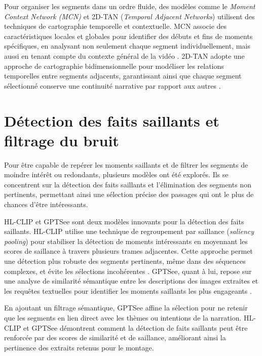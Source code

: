 \documentclass[livre]{udes-genie-these}
\begin{document}
Pour organiser les segments dans un ordre fluide, des modèles comme le \textit{Moment Context Network (MCN)} \cite{anonymous2017_localizing} et 2D-TAN (\textit{Temporal Adjacent Networks}) \cite{zhang2020_temporal} utilisent des techniques de cartographie temporelle et contextuelle. MCN associe des caractéristiques locales et globales pour identifier des débuts et fins de moments spécifiques, en analysant non seulement chaque segment individuellement, mais aussi en tenant compte du contexte général de la vidéo \cite{zhang2016_lstm}\cite{zhang2019_memory}. 2D-TAN adopte une approche de cartographie bidimensionnelle pour modéliser les relations temporelles entre segments adjacents, garantissant ainsi que chaque segment sélectionné conserve une continuité narrative par rapport aux autres \cite{prabhu2017_retrieval}\cite{zhang2020_temporal}.

\section{Détection des faits saillants et filtrage du bruit}

Pour être capable de repérer les moments saillants et de filtrer les segments de moindre intérêt ou redondants, plusieurs modèles ont été explorés. Ils se concentrent sur la détection des faits saillants et l’élimination des segments non pertinents, permettant ainsi une sélection précise des passages qui ont le plus de chances d’être intéressants. 

HL-CLIP \cite{han2024_clip} et GPTSee \cite{sun2023_gptsee} sont deux modèles innovants pour la détection des faits saillants. HL-CLIP utilise une technique de regroupement par saillance (\textit{saliency pooling}) pour stabiliser la détection de moments intéressants en moyennant les scores de saillance à travers plusieurs trames adjacentes. Cette approche permet une détection plus robuste des segments pertinents, même dans des séquences complexes, et évite les sélections incohérentes \cite{you2023_ferret}\cite{sun2023_gptsee}. GPTSee, quant à lui, repose sur une analyse de similarité sémantique entre les descriptions des images extraites et les requêtes textuelles pour identifier les moments saillants les plus engageants \cite{sun2023_gptsee}\cite{liu2022_umt}. 

En ajoutant un filtrage sémantique, GPTSee affine la sélection pour ne retenir que les segments en lien direct avec les thèmes ou intentions de la narration. HL-CLIP et GPTSee démontrent comment la détection de faits saillants peut être renforcée par des scores de similarité et de saillance, améliorant ainsi la pertinence des extraits retenus pour le montage. 
\end{document}
